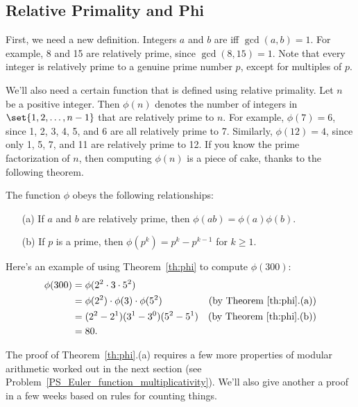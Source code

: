 \subsection{Relative Primality and Phi}

First, we need a new definition.  Integers $a$ and $b$ are
 iff $\gcd(a, b) = 1$.  For example, 8 and 15
are relatively prime, since $\gcd(8, 15) = 1$.  Note that every
integer is relatively prime to a genuine prime number $p$, except for
multiples of $p$.

We'll also need a certain function that is defined using relative
primality.  Let $n$ be a positive integer.  Then $\phi(n)$ denotes the
number of integers in $\set{1, 2, \dots, n - 1}$ that are relatively
prime to $n$.  For example, $\phi(7) = 6$, since 1, 2, 3, 4, 5, and 6
are all relatively prime to 7.  Similarly, $\phi(12) = 4$, since only
1, 5, 7, and 11 are relatively prime to 12.  If you know the prime
factorization of $n$, then computing $\phi(n)$ is a piece of cake,
thanks to the following theorem.

\begin{theorem}
\label{th:phi}
The function $\phi$ obeys the following relationships:
\begin{enumerate}
\item[(a)] If $a$ and $b$ are relatively prime, then $\phi(ab) = \phi(a)\phi(b)$.
\item[(b)] If $p$ is a prime, then $\phi(p^k) = p^k - p^{k-1}$ for $k \geq 1$.
\end{enumerate}
\end{theorem}

Here's an example of using Theorem~\ref{th:phi} to compute $\phi(300)$:
%
\begin{align*}
\phi(300)
    & = \phi(2^2 \cdot 3 \cdot 5^2)\\
    & = \phi(2^2) \cdot \phi(3) \cdot \phi(5^2)
            & \text{(by Theorem~\ref{th:phi}.(a))}\\
    & = (2^2 - 2^1) (3^1 - 3^0) (5^2 - 5^1) 
            & \text{(by Theorem~\ref{th:phi}.(b))}\\
    & = 80.
\end{align*}

The proof of Theorem~\ref{th:phi}.(a) requires a few more properties of
modular arithmetic worked out in the next section (see
Problem~\ref{PS_Euler_function_multiplicativity}).  We'll also give
another a proof in a few weeks based on rules for counting things.

